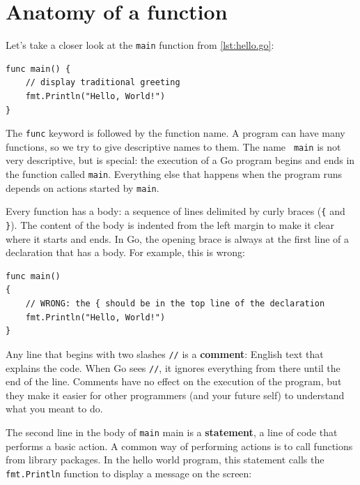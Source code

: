 \section{Anatomy of a function}
\label{function!syntax}

Let's take a closer look at the {\tt main} function from \ref{lst:hello.go}:

\begin{lstlisting}
func main() {
	// display traditional greeting
	fmt.Println("Hello, World!")
}
\end{lstlisting}


The {\tt func} keyword is followed by the function name. A program can have
many functions, so we try to give descriptive names to them. The name {\tt
main} is not very descriptive, but is special: the execution of a Go program
begins and ends in the function called {\tt main}. Everything else that
happens when the program runs depends on actions started by {\tt main}.


Every function has a body: a sequence of lines delimited by curly braces
({\tt\{} and {\tt\}}). The content of the body is indented from the left
margin to make it clear where it starts and ends. In Go, the opening brace is
always at the first line of a declaration that has a body. For example, this
is wrong:

\begin{lstlisting}
func main()
{
	// WRONG: the { should be in the top line of the declaration
	fmt.Println("Hello, World!")
}
\end{lstlisting}


Any line that begins with two slashes {\tt //} is a {\bf comment}: English
text that explains the code. When Go sees {\tt //}, it ignores everything from
there until the end of the line. Comments have no effect on the execution of
the program, but they make it easier for other programmers (and your future
self) to understand what you meant to do.

The second line in the body of {\tt main} main is a {\bf statement}, a line of
code that performs a basic action. A common way of performing actions is to
call functions from library packages. In the hello world program, this
statement calls the {\tt fmt.Println} function to display a message on the
screen:

